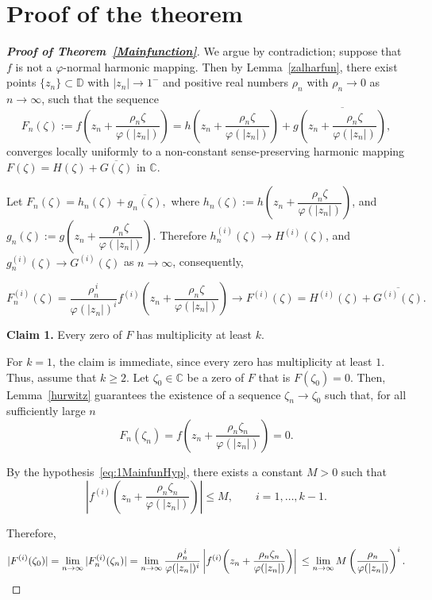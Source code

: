 \documentclass[11pt, reqno]{amsart}
\numberwithin{equation}{section}
\theoremstyle{definition}
\theoremstyle{remark}
\theoremstyle{plain}
\begin{document}
\section{Proof of the theorem}
\begin{proof}[\bf{Proof of Theorem~\ref{Mainfunction}}]
 We argue by contradiction; suppose that $f$ is not a
$\varphi$-normal harmonic mapping. Then by Lemma~\ref{zalharfun},
there exist points
$\{z_n\}\subset\mathbb{D}$ with $|z_n|\to 1^-$ 
and positive real numbers 
$\rho_n$ with
$\rho_n\to 0$ as $n\to\infty$, such that the sequence
\begin{equation}\label{eq: zalharfun}
F_n(\zeta)
:=
f\!\left(
z_n+\frac{\rho_n\zeta}{\varphi(|z_n|)}
\right)
=
h\!\left(
z_n+\frac{\rho_n\zeta}{\varphi(|z_n|)}
\right)
+
\overline{
g\!\left(
z_n+\frac{\rho_n\zeta}{\varphi(|z_n|)}
\right),
}
\end{equation}
converges locally uniformly to
a non-constant
 sense-preserving harmonic mapping
$F(\zeta)=H(\zeta)+\overline{G(\zeta)}$ in $\mathbb{C}$.

Let
$
F_n(\zeta)=h_n(\zeta)+\overline{g_n(\zeta)},
$
where
$h_n(\zeta)
:=
h\!\left(
z_n+\dfrac{\rho_n\zeta}{\varphi(|z_n|)}
\right)$, and 
$g_n(\zeta)
:=
g\!\left(
z_n+\dfrac{\rho_n\zeta}{\varphi(|z_n|)}
\right).
$
Therefore
$
h_n^{(i)}(\zeta)\to H^{(i)}(\zeta)$,
and
$g_n^{(i)}(\zeta)\to G^{(i)}(\zeta)
$
as $n\to\infty$, consequently,

\[
F_n^{(i)}(\zeta)
=
\frac{\rho_n^{\,i}}{\varphi(|z_n|)^i}
f^{(i)}
\!\left(
z_n+\frac{\rho_n\zeta}{\varphi(|z_n|)}
\right)
\longrightarrow
F^{(i)}(\zeta)
=
H^{(i)}(\zeta)+\overline{G^{(i)}(\zeta)}.
\]
\smallskip 

\noindent
\textbf{Claim 1.}
Every zero of $F$ has multiplicity at least $k$.\smallskip

For $k=1$, the claim is immediate, since every zero has multiplicity at least $1$. 
Thus, assume that $k\ge2$.
 Let $\zeta_0\in\mathbb C$ be a zero of $F$ that is $F(\zeta_0)=0$.
Then, Lemma~\ref{hurwitz} guarantees the existence of
 a sequence
$\zeta_n\to\zeta_0$ such that, for all sufficiently large $n$
\[
F_n(\zeta_n)
=
f\!\left(
z_n+\frac{\rho_n\zeta_n}{\varphi(|z_n|)}
\right)
=0.
\]

By the hypothesis~\eqref{eq:1MainfunHyp}, there exists a
 constant $M>0$ such that
\[
\left|
f^{(i)}
\!\left(
z_n+\frac{\rho_n\zeta_n}{\varphi(|z_n|)}
\right)
\right|
\le M,
\qquad
i=1,\ldots,k-1.
\]

Therefore,
\begin{equation}\label{eq: fi0}
|F^{(i)}(\zeta_0)|
=
\lim_{n\to\infty}
|F_n^{(i)}(\zeta_n)|  \\
=
\lim_{n\to\infty}
\frac{\rho_n^{\,i}}
{\varphi(|z_n|)^i}
\left|f^{(i)}
\!\left(
z_n+\frac{\rho_n\zeta_n}{\varphi(|z_n|)}
\right)\right|     \\
\le
\lim_{n\to\infty}
M
\left(
\frac{\rho_n}{\varphi(|z_n|)}
\right)^i .
\end{equation}


\end{proof}
\end{document}
